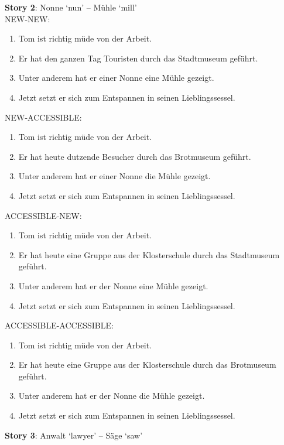 \textbf{Story 2}: Nonne `nun' – Mühle `mill'\\

NEW-NEW:

\begin{enumerate}
\item Tom ist richtig müde von der Arbeit.
\item Er hat den ganzen Tag Touristen durch das Stadtmuseum geführt.
\item Unter anderem hat er einer Nonne eine Mühle gezeigt.
\item Jetzt setzt er sich zum Entspannen in seinen Lieblingssessel.
\end{enumerate}

NEW-ACCESSIBLE:

\begin{enumerate}
\item Tom ist richtig müde von der Arbeit.
\item Er hat heute dutzende Besucher durch das Brotmuseum geführt.
\item Unter anderem hat er einer Nonne die Mühle gezeigt.
\item Jetzt setzt er sich zum Entspannen in seinen Lieblingssessel.
\end{enumerate}

ACCESSIBLE-NEW:

\begin{enumerate}
\item Tom ist richtig müde von der Arbeit.
\item Er hat heute eine Gruppe aus der Klosterschule durch das Stadtmuseum geführt.
\item Unter anderem hat er der Nonne eine Mühle gezeigt.
\item Jetzt setzt er sich zum Entspannen in seinen Lieblingssessel.
\end{enumerate}

ACCESSIBLE-ACCESSIBLE:

\begin{enumerate}
\item Tom ist richtig müde von der Arbeit.
\item Er hat heute eine Gruppe aus der Klosterschule durch das Brotmuseum geführt.
\item Unter anderem hat er der Nonne die Mühle gezeigt.
\item Jetzt setzt er sich zum Entspannen in seinen Lieblingssessel.
\end{enumerate}

\textbf{Story 3}: Anwalt `lawyer' – Säge `saw'\\

